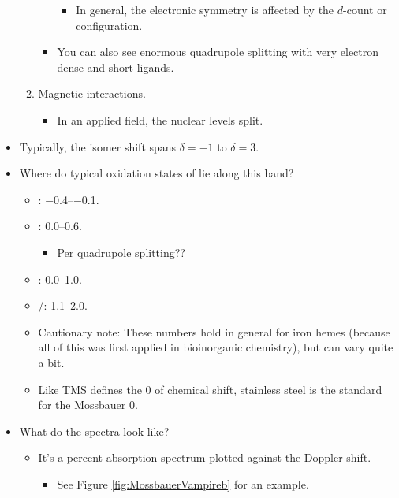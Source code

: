 \documentclass[../notes.tex]{subfiles}
\begin{document}
\begin{itemize}
\begin{enumerate}
\begin{itemize}
            \begin{itemize}
                \item In general, the electronic symmetry is affected by the $d$-count or configuration.
            \end{itemize}
            \item You can also see enormous quadrupole splitting with very electron dense and short ligands.
        \end{itemize}
        \item Magnetic interactions.
        \begin{itemize}
            \item In an applied field, the nuclear levels split.
        \end{itemize}
    \end{enumerate}
    \item Typically, the isomer shift spans $\delta=-1$ to $\delta=3$.
    \item Where do typical oxidation states of  lie along this band?
    \begin{itemize}
        \item {}: \numrange[range-phrase={ to }]{-0.4}{-0.1}.
        \item {}: \numrange[range-phrase={ to }]{0.0}{0.6}.
        \begin{itemize}
            \item Per quadrupole splitting??
        \end{itemize}
        \item {}: \numrange[range-phrase={ to }]{0.0}{1.0}.
        \item {}/: \numrange[range-phrase={ to }]{1.1}{2.0}.
        \item Cautionary note: These numbers hold in general for iron hemes (because all of this was first applied in bioinorganic chemistry), but can vary quite a bit.
        \item Like TMS defines the 0 of chemical shift, stainless steel is the standard for the Mossbauer 0.
    \end{itemize}
    \item What do the spectra look like?
    \begin{itemize}
        \item It's a percent absorption spectrum plotted against the Doppler shift.
        \begin{itemize}
            \item See Figure \ref{fig:MossbauerVampireb} for an example.

\end{itemize}
\end{itemize}
\end{itemize}
\end{document}
